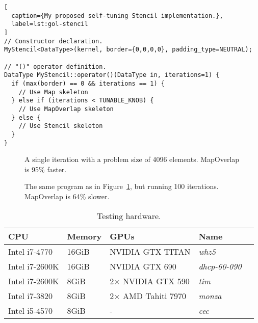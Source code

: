 \newpage
\lstset{language=C++}
\begin{lstlisting}[
  caption={My proposed self-tuning Stencil implementation.},
  label=lst:gol-stencil
]
// Constructor declaration.
MyStencil<DataType>(kernel, border={0,0,0,0}, padding_type=NEUTRAL);

// "()" operator definition.
DataType MyStencil::operator()(DataType in, iterations=1) {
  if (max(border) == 0 && iterations == 1) {
    // Use Map skeleton
  } else if (iterations < TUNABLE_KNOB) {
    // Use MapOverlap skeleton
  } else {
    // Use Stencil skeleton
  }
}
\end{lstlisting}

\begin{figure}


\caption{A single iteration with a problem size of 4096 elements. MapOverlap is 95\% faster.}
\label{fig:1iter}
\end{figure}

\begin{figure}


\caption{The same program as in Figure~\ref{fig:1iter}, but running 100 iterations. MapOverlap is 64\% slower.}
\label{fig:}
\end{figure}

\begin{table}
\footnotesize
\centering
\begin{tabular}{| l | l | l | l | l |}
\hline
\textbf{CPU} & \textbf{Memory} & \textbf{GPUs} & \textbf{Name}\\
\hline
Intel i7-4770 & 16GiB & NVIDIA GTX TITAN & \textit{whz5}\\
Intel i7-2600K & 16GiB & NVIDIA GTX 690 & \textit{dhcp-60-090}\\
Intel i7-2600K & 8GiB & 2$\times$ NVIDIA GTX 590 & \textit{tim}\\
Intel i7-3820 & 8GiB & 2$\times$ AMD Tahiti 7970 & \textit{monza}\\
Intel i5-4570 & 8GiB & - & \textit{cec}\\
\hline
\end{tabular}
\caption{%
  Testing hardware.%
}
\label{tab:hw}
\end{table}

